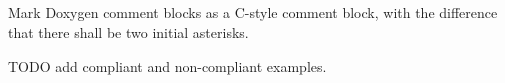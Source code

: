 \subsection*{\doxygenRule{}}

Mark Doxygen comment blocks as a C-style comment block, with the difference that there shall be two initial asterisks.

TODO add compliant and non-compliant examples.
